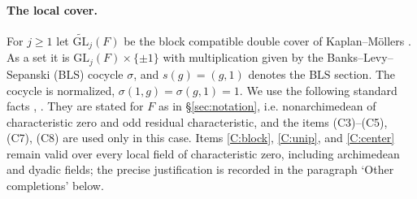 \documentclass[11pt,oneside,notitlepage]{book}
\numberwithin{equation}{section}
\theoremstyle{plain}
\theoremstyle{definition}
\newcommand{\GL}{\mathrm{GL}}
\newcommand{\tGL}{\widetilde{\GL}}
\begin{document}
\paragraph{The local cover.}
For $j\ge1$ let $\tGL_j(F)$ be the block compatible double cover of Kaplan--M\"ollers \cite{KM}. As a set it is $\GL_j(F)\times\{\pm1\}$ with multiplication given by the Banks--Levy--Sepanski (BLS) cocycle $\sigma$, and $s(g)=(g,1)$ denotes the BLS section. The cocycle is normalized, $\sigma(1,g)=\sigma(g,1)=1$. We use the following standard facts \cite[\S1, \S2.1, Claims 3.7, 3.18, 3.27]{KM}, \cite{Kable}. They are stated for $F$ as in \S\ref{sec:notation}, i.e. nonarchimedean of characteristic zero and odd residual characteristic, and the items (C3)–(C5), (C7), (C8) are used only in this case. Items \ref{C:block}, \ref{C:unip}, and \ref{C:center} remain valid over every local field of characteristic zero, including archimedean and dyadic fields; the precise justification is recorded in the paragraph `Other completions' below.
\end{document}
